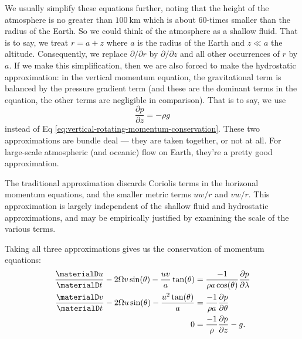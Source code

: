 We usually simplify these equations further, noting that the height of
the atmosphere is no greater than $\SI{100}{\km}$ which is about
60-times smaller than the radius of the Earth. So we could think of the
atmosphere as a shallow fluid.
That is to say, we treat $r=a+z$ where
$a$ is the radius of the Earth and $z\ll a$ the altitude. Consequently,
we replace $\partial/\partial r$ by $\partial/\partial z$ and all other
occurrences of $r$ by $a$. If we make this simplification, then we
are also forced to make the hydrostatic
approximation: in the vertical
momentum equation, the gravitational term is balanced by the pressure
gradient term (and these are the dominant terms in the equation, the
other terms are negligible in comparison). That is to say, we use
\begin{equation}
  \frac{\partial p}{\partial z}=-\rho g
\end{equation}
instead of Eq \eqref{eq:vertical-rotating-momentum-conservation}. These
two approximations are bundle deal --- they are taken together, or not
at all. For large-scale atmospheric (and oceanic) flow on Earth, they're
a pretty good approximation.

The traditional approximation discards Coriolis terms in the horizonal
momentum equations, and the smaller metric terms $uw/r$ and
$vw/r$. This approximation is largely independent of the shallow fluid
and hydrostatic approximations, and may be empirically justified by
examining the scale of the various terms.

\begin{prop}
Taking all three approximations gives us the conservation of momentum equations:
\begin{subequations}
  \begin{align}
    \frac{\materialD u}{\materialD t}
    - 2\Omega v\sin(\theta) - \frac{uv}{a}\tan(\theta)
    &= \frac{-1}{\rho a\cos(\theta)}\frac{\partial p}{\partial\lambda}\\
    \frac{\materialD v}{\materialD t}
    - 2\Omega u\sin(\theta) - \frac{u^{2}\tan(\theta)}{a}
    &= \frac{-1}{\rho a}\frac{\partial p}{\partial\theta} \\
    0 &= \frac{-1}{\rho}\frac{\partial p}{\partial z}-g.
  \end{align}
\end{subequations}
\end{prop}

